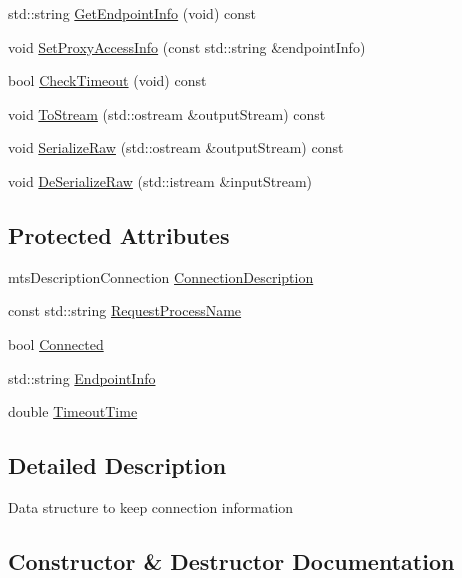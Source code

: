 \begin{DoxyCompactItemize}
std\+::string \hyperlink{classmts_connection_a995804182172f108d74d7921e8335884}{Get\+Endpoint\+Info} (void) const 
\item 
void \hyperlink{classmts_connection_ae3cb5e96eb3b93919f1a43d3f4ec19be}{Set\+Proxy\+Access\+Info} (const std\+::string \&endpoint\+Info)
\item 
bool \hyperlink{classmts_connection_a60f579a4b4c6b4e08497b48ed4ef41a4}{Check\+Timeout} (void) const 
\item 
void \hyperlink{classmts_connection_ac622a2e9885cfbbc588f9a08a0849f38}{To\+Stream} (std\+::ostream \&output\+Stream) const 
\item 
void \hyperlink{classmts_connection_a2a29a2b202174b39c7b0f93d18791fb5}{Serialize\+Raw} (std\+::ostream \&output\+Stream) const 
\item 
void \hyperlink{classmts_connection_a893608b72a416d37013db5d036482100}{De\+Serialize\+Raw} (std\+::istream \&input\+Stream)
\end{DoxyCompactItemize}
\subsection*{Protected Attributes}
\begin{DoxyCompactItemize}
\item 
mts\+Description\+Connection \hyperlink{classmts_connection_a0a529fcb9c6627e79c49eb05265dd43e}{Connection\+Description}
\item 
const std\+::string \hyperlink{classmts_connection_a81c4b5147db8f46d70b30c7fabbc72c8}{Request\+Process\+Name}
\item 
bool \hyperlink{classmts_connection_a2384cf6081cf01b9330bf6810108c2b5}{Connected}
\item 
std\+::string \hyperlink{classmts_connection_ad5e701a7d4fe0a27b084d0f8d161c7d6}{Endpoint\+Info}
\item 
double \hyperlink{classmts_connection_a6c190911c627762bcdc0a2145a6739c8}{Timeout\+Time}
\end{DoxyCompactItemize}


\subsection{Detailed Description}
Data structure to keep connection information 

\subsection{Constructor \& Destructor Documentation}
\hypertarget{classmts_connection_a071972ee336069bba608bd6737251c80}{}
